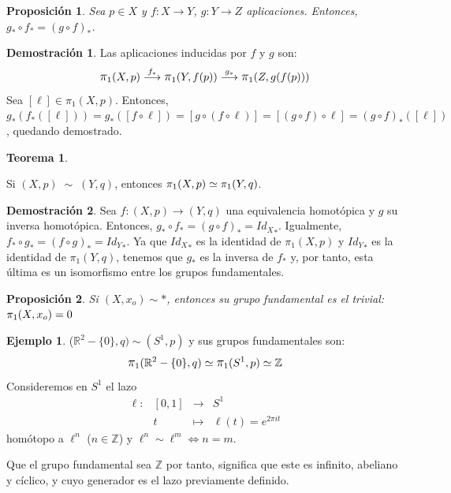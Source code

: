 \documentclass[12pt,twoside]{report}
\theoremstyle{azul}
\theoremstyle{azul2}
\theoremstyle{plain}
\newtheorem*{prop}{Proposición}
\theoremstyle{definition}
\newtheorem*{eje}{Ejemplo}
\newtheorem*{dem}{Demostración}
\newtheorem*{teo}{Teorema}
\theoremstyle{remark}
\newcommand\bigpi{\mathlarger{\pi}}
\begin{document}
\begin{prop}
Sea $p \in X$ y $f: X \rightarrow Y$, $g : Y \rightarrow Z$ aplicaciones. Entonces, $g_* \circ f_* = (g \circ f)_*$.
\end{prop}
\begin{dem}
Las aplicaciones inducidas por $f$ y $g$ son:
$$\bigpi_1(X,p) \overset{f_*}{\longrightarrow} \bigpi_1(Y,f(p)) \overset{g_*}{\longrightarrow} \bigpi_1(Z,g(f(p)))$$
Sea $[\ell] \in \pi_1(X,p)$. Entonces, $g_* (f_* ([\ell])) = g_* ([f \circ \ell]) = [g \circ (f \circ \ell)] = [(g \circ f) \circ \ell] = (g \circ f)_* ([\ell])$, quedando demostrado.
\end{dem}

\begin{teo} \;
\begin{tcolorbox}
\begin{center}
    
Si $(X,p) \; \sim \; (Y,q)$, entonces $\bigpi_1(X,p) \simeq \bigpi_1(Y,q)$.
\end{center}
\end{tcolorbox}
\end{teo}
\begin{dem}
Sea $f:(X,p) \rightarrow (Y,q)$ una equivalencia homotópica y $g$ su inversa homotópica. Entonces, $g_* \circ f_* = (g \circ f)_* = {Id_X}_*$. Igualmente, $f_* \circ g_* = (f \circ g)_* = {Id_Y}_*$. Ya que ${Id_X}_*$ es la identidad de $\pi_1(X,p)$ y ${Id_Y}_*$ es la identidad de $\pi_1(Y,q)$, tenemos que $g_*$ es la inversa de $f_*$ y, por tanto, esta última es un isomorfismo entre los grupos fundamentales.
\end{dem}
\begin{prop}
    Si $(X,x_o) \sim *$, entonces su grupo fundamental es el trivial: 
    $\mathlarger{\pi}_1(X,x_o)=0$
\end{prop}
\begin{eje}
    ($\mathbb{R}^2-\{0\},q) \sim (S^1,p)$ y sus grupos fundamentales son:$$\mathlarger{\pi}_1(\mathbb{R}^2-\{0\}, q)\simeq \mathlarger{\pi}_1(S^1,p) \simeq \mathbb{Z}$$
    Consideremos en $S^1$ el lazo 
    $$\begin{array}{rrcl}
         \ell : & [0,1] & \longrightarrow & S^1  \\
         & t & \longmapsto & \ell(t)=e^{2 \pi i t} 
    \end{array}$$
    homótopo a $\ell^n$ ($n \in \mathbb{Z}$) y $\ell^n \sim \ell^m \iff n = m$.

        Que el grupo fundamental sea $\mathbb{Z}$ por tanto, significa que este es infinito, abeliano y cíclico, y cuyo generador es el lazo previamente definido.
    \end{eje}
\end{document}
